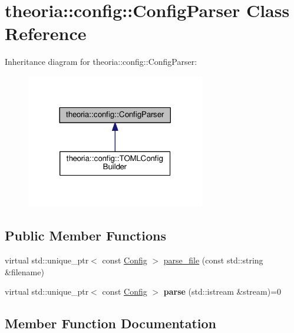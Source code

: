 \hypertarget{classtheoria_1_1config_1_1ConfigParser}{}\section{theoria\+:\+:config\+:\+:Config\+Parser Class Reference}
\label{classtheoria_1_1config_1_1ConfigParser}


Inheritance diagram for theoria\+:\+:config\+:\+:Config\+Parser\+:
\nopagebreak
\begin{figure}[H]
\begin{center}
\leavevmode
\includegraphics[width=221pt]{classtheoria_1_1config_1_1ConfigParser__inherit__graph}
\end{center}
\end{figure}
\subsection*{Public Member Functions}
\begin{DoxyCompactItemize}
\item 
virtual std\+::unique\+\_\+ptr$<$ const \hyperlink{classtheoria_1_1config_1_1Config}{Config} $>$ \hyperlink{classtheoria_1_1config_1_1ConfigParser_a4eca80a9831324237f2a2aa9a5018c89}{parse\+\_\+file} (const std\+::string \&filename)
\item 
\mbox{\label{classtheoria_1_1config_1_1ConfigParser_af0ccd3cc2202c3d588a977c611dfa988}} 
virtual std\+::unique\+\_\+ptr$<$ const \hyperlink{classtheoria_1_1config_1_1Config}{Config} $>$ {\bfseries parse} (std\+::istream \&stream)=0
\end{DoxyCompactItemize}


\subsection{Member Function Documentation}
\mbox{\label{classtheoria_1_1config_1_1ConfigParser_a4eca80a9831324237f2a2aa9a5018c89}} 
